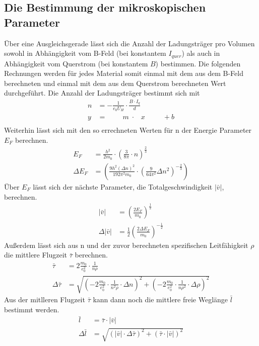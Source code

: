 \subsection{Die Bestimmung der mikroskopischen Parameter}
\label{subsubsec:mikro_Param}
Über eine Ausgleichsgerade lässt sich die Anzahl der Ladungsträger pro Volumen sowohl in Abhängigkeit vom B-Feld (bei konstantem $I_{quer}$) als auch in Abhängigkeit vom Querstrom (bei konstantem $B$) bestimmen.
Die folgenden Rechnungen werden für jedes Material somit einmal mit dem aus dem B-Feld berechneten und einmal mit dem aus dem Querstrom berechneten Wert durchgeführt.
Die Anzahl der Ladungsträger bestimmt sich mit
\begin{align*}
    n &= -\frac{1}{e_0 U_H}\cdot \frac{B\cdot I_q}{d} \\
    y &= \;\;\; \; \; \; \; \;  m \; \cdot \; \; \; x \; \; \; \; \; \; \; \; \; +b\\
\end{align*}
Weiterhin lässt sich mit den so errechneten Werten für n der Energie Parameter $E_F$ berechnen.
\begin{align*}
    E_F &= \frac{h^2}{2 m_0}\cdot \left(\frac{3}{8\pi}\cdot n \right)^{\frac{2}{3}} \\
    \Delta E_F &= \left( \frac{9 h^2  \left(\Delta n\right)^2}{192 \pi^2 m_0} \cdot \left( \frac{9}{64\pi^2} \Delta n^2\right)^{-\frac{2}{3}}  \right)
\end{align*}
Über $E_F$ lässt sich der nächste Parameter, die Totalgeschwindigkeit $|\bar{v}|$, berechnen.
\begin{align*}
    |\bar{v}| &= \left(\frac{2 E_F}{m_0}\right)^{\frac{1}{2}} \\
    \Delta |\bar{v}| &= \frac{1}{2} \left(\frac{2 \Delta E_F}{m_0}\right)^{-\frac{1}{2}}
\end{align*}
Außerdem lässt sich aus n und der zuvor berechneten spezifischen Leitfähigkeit $\rho$ die mittlere Flugzeit $\bar{\tau}$ berechnen.
\begin{align*}
    \bar{\tau} &= 2 \frac{m_0}{e_0^2} \cdot \frac{1}{n \rho} \\
    \Delta \bar{\tau} &= \sqrt{ \left( -2 \frac{m_0}{e_0^2} \cdot \frac{1}{n^2 \rho} \cdot \Delta n \right)^2 + \left( -2 \frac{m_0}{e_0^2} \cdot \frac{1}{n \rho^2} \cdot \Delta \rho \right)^2 }
\end{align*}
Aus der mitlleren Flugzeit $\bar{\tau}$ kann dann noch die mittlere freie Weglänge $\bar{l}$ bestimmt werden.
\begin{align*}
    \bar{l} &= \bar{\tau} \cdot |\bar{v}| \\
    \Delta \bar{l} &= \sqrt{\left(|\bar{v}|\cdot\Delta\bar{\tau}\right)^2+\left(\bar{\tau}\cdot|\bar{v}|\right)^2}
\end{align*}
